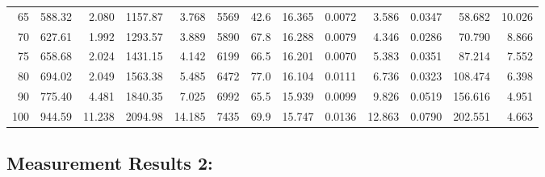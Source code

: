 \documentclass[10pt]{article}
\begin{document}
{\begin{tabular}{|r|rr|rr|rr|rr|rr|r|r|}
       65 &       588.32 &        2.080 &      1157.87 &        3.768 &         5569 &         42.6 &       16.365 &       0.0072 &        3.586 &       0.0347 &       58.682 &       10.026 \\
       70 &       627.61 &        1.992 &      1293.57 &        3.889 &         5890 &         67.8 &       16.288 &       0.0079 &        4.346 &       0.0286 &       70.790 &        8.866 \\
       75 &       658.68 &        2.024 &      1431.15 &        4.142 &         6199 &         66.5 &       16.201 &       0.0070 &        5.383 &       0.0351 &       87.214 &        7.552 \\
       80 &       694.02 &        2.049 &      1563.38 &        5.485 &         6472 &         77.0 &       16.104 &       0.0111 &        6.736 &       0.0323 &      108.474 &        6.398 \\
       90 &       775.40 &        4.481 &      1840.35 &        7.025 &         6992 &         65.5 &       15.939 &       0.0099 &        9.826 &       0.0519 &      156.616 &        4.951 \\
      100 &       944.59 &       11.238 &      2094.98 &       14.185 &         7435 &         69.9 &       15.747 &       0.0136 &       12.863 &       0.0790 &      202.551 &        4.663 \\
\hline
\end{tabular}
}



\subsection*{\large \bf Measurement Results 2:}
\end{document}
